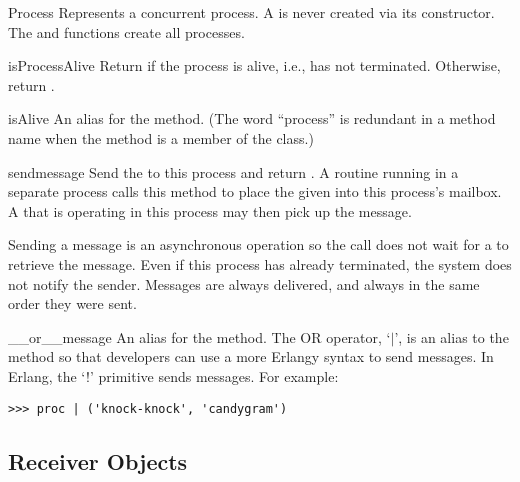 \documentclass{howto}
\newcommand{\pipe}[0]{\begin{math}|\end{math}}
\newcommand{\pipe}[0]{|}
\begin{document}
\begin{classdesc}{Process}{}
Represents a concurrent process. A  is never created via its
constructor. The  and  functions create
all processes.

\begin{methoddesc}{isProcessAlive}{}
Return  if the process is alive, i.e., has not terminated.
Otherwise, return .
\end{methoddesc}

\begin{methoddesc}{isAlive}{}
An alias for the  method. (The word ``process'' is
redundant in a method name when the method is a member of the 
class.)
\end{methoddesc}

\begin{methoddesc}{send}{message}
Send the  to this process and return . A routine
running in a separate process calls this method to place the given
 into this process's mailbox. A  that is operating
in this process may then pick up the message.

Sending a message is an asynchronous operation so the  call does
not wait for a  to retrieve the message. Even if this process
has already terminated, the system does not notify the sender. Messages are
always delivered, and always in the same order they were sent.
\end{methoddesc}

\begin{methoddesc}{__or__}{message}
\opindex{|}
An alias for the  method. The OR operator, `\pipe', is an alias
to the  method so that developers can use a more Erlangy syntax
to send messages. In Erlang, the `!' primitive sends messages. For example:
\begin{verbatim}
>>> proc | ('knock-knock', 'candygram')
\end{verbatim}
\end{methoddesc}

\end{classdesc}



\subsection{Receiver Objects}
\label{Receiver}
\end{document}
